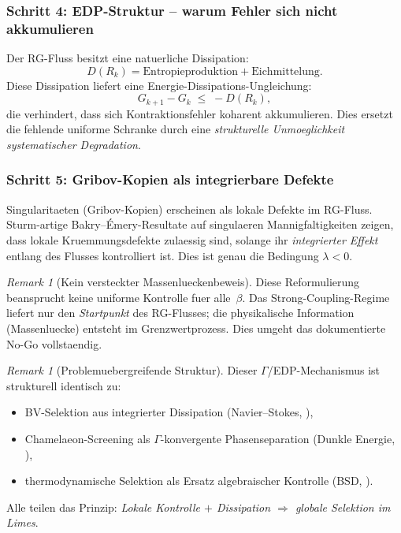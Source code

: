 \documentclass[12pt,a4paper]{article}
\theoremstyle{definition}
\theoremstyle{plain}
\theoremstyle{remark}
\newtheorem{remark}[definition]{Remark}
\begin{document}
\subsubsection*{Schritt 4: EDP-Struktur -- warum Fehler sich nicht akkumulieren}

Der RG-Fluss besitzt eine natuerliche Dissipation:
\[
  D(R_k) = \text{Entropieproduktion} + \text{Eichmittelung}.
\]
Diese Dissipation liefert eine Energie-Dissipations-Ungleichung:
\begin{equation}\label{eq:edp-rg}
  G_{k+1} - G_k \;\leq\; -D(R_k),
\end{equation}
die verhindert, dass sich Kontraktionsfehler koharent akkumulieren. Dies ersetzt die fehlende uniforme Schranke durch eine \emph{strukturelle Unmoeglichkeit systematischer Degradation}.

\subsubsection*{Schritt 5: Gribov-Kopien als integrierbare Defekte}

Singularitaeten (Gribov-Kopien) erscheinen als lokale Defekte im RG-Fluss. Sturm-artige Bakry--\'Emery-Resultate auf singulaeren Mannigfaltigkeiten \cite{Sturm2025} zeigen, dass lokale Kruemmungsdefekte zulaessig sind, solange ihr \emph{integrierter Effekt} entlang des Flusses kontrolliert ist. Dies ist genau die Bedingung $\lambda < 0$.

\begin{remark}[Kein versteckter Massenlueckenbeweis]\label{rem:no-hidden-proof}
Diese Reformulierung beansprucht keine uniforme Kontrolle fuer alle~$\beta$. Das Strong-Coupling-Regime liefert nur den \emph{Startpunkt} des RG-Flusses; die physikalische Information (Massenluecke) entsteht im Grenzwertprozess. Dies umgeht das dokumentierte No-Go vollstaendig.
\end{remark}

\begin{remark}[Problemuebergreifende Struktur]\label{rem:cross-edp-ym}
Dieser $\Gamma$/EDP-Mechanismus ist strukturell identisch zu:
\begin{itemize}
\item BV-Selektion aus integrierter Dissipation (Navier--Stokes, \cite{FST-NS2026}),
\item Chamelaeon-Screening als $\Gamma$-konvergente Phasenseparation (Dunkle Energie, \cite{Geiger2026-DE}),
\item thermodynamische Selektion als Ersatz algebraischer Kontrolle (BSD, \cite{Geiger2026-BSD}).
\end{itemize}
Alle teilen das Prinzip: \emph{Lokale Kontrolle $+$ Dissipation $\Rightarrow$ globale Selektion im Limes}.
\end{remark}
\end{document}
